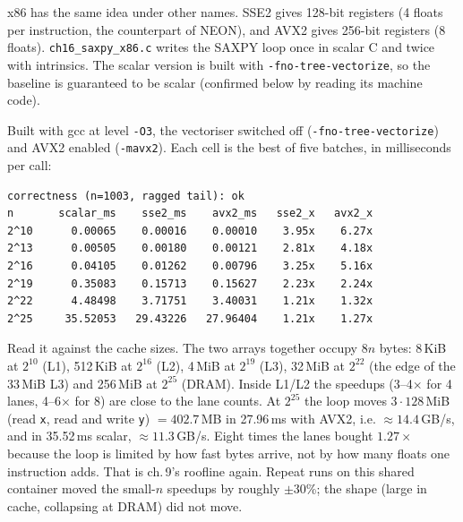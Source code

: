 x86 has the same idea under other names. SSE2 gives 128-bit registers
(4 floats per instruction, the counterpart of NEON), and AVX2 gives
256-bit registers (8 floats). \texttt{ch16\_saxpy\_x86.c} writes the
SAXPY loop once in scalar C and twice with intrinsics. The scalar
version is built with \texttt{-fno-tree-vectorize}, so the baseline
is guaranteed to be scalar (confirmed below by reading its machine
code).



\begin{example}
Built with gcc at level \texttt{-O3}, the vectoriser switched off
(\texttt{-fno-tree-vectorize}) and AVX2 enabled (\texttt{-mavx2}).
Each cell is the best of five batches, in milliseconds per call:

{\scriptsize
\begin{verbatim}
correctness (n=1003, ragged tail): ok
n       scalar_ms    sse2_ms    avx2_ms   sse2_x   avx2_x
2^10      0.00065    0.00016    0.00010    3.95x    6.27x
2^13      0.00505    0.00180    0.00121    2.81x    4.18x
2^16      0.04105    0.01262    0.00796    3.25x    5.16x
2^19      0.35083    0.15713    0.15627    2.23x    2.24x
2^22      4.48498    3.71751    3.40031    1.21x    1.32x
2^25     35.52053   29.43226   27.96404    1.21x    1.27x
\end{verbatim}
}
Read it against the cache sizes. The two arrays together occupy
$8n$ bytes: 8\,KiB at $2^{10}$ (L1), 512\,KiB at $2^{16}$ (L2),
4\,MiB at $2^{19}$ (L3), 32\,MiB at $2^{22}$ (the edge of the 33\,MiB
L3) and 256\,MiB at $2^{25}$ (DRAM). Inside L1/L2 the speedups
(3--4$\times$ for 4 lanes, 4--6$\times$ for 8) are close to the lane
counts. At $2^{25}$ the loop moves $3\cdot 128$\,MiB (read \texttt{x},
read and write \texttt{y}) $=402.7$\,MB in 27.96\,ms with AVX2, i.e.
$\approx 14.4$\,GB/s, and in 35.52\,ms scalar, $\approx 11.3$\,GB/s.
Eight times the lanes bought $1.27\times$ because the loop is limited
by how fast bytes arrive, not by how many floats one instruction
adds. That is ch.\,9's roofline again. Repeat runs on this shared
container moved the small-$n$ speedups by roughly $\pm$30\%; the
shape (large in cache, collapsing at DRAM) did not move.
\end{example}

